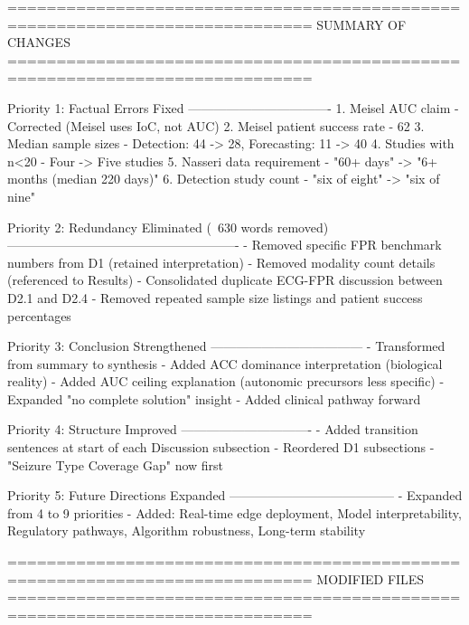 
=============================================================================
SUMMARY OF CHANGES
=============================================================================

Priority 1: Factual Errors Fixed
----------------------------------
1. Meisel AUC claim - Corrected (Meisel uses IoC, not AUC)
2. Meisel patient success rate - 62%
3. Median sample sizes - Detection: 44 -> 28, Forecasting: 11 -> 40
4. Studies with n<20 - Four -> Five studies
5. Nasseri data requirement - "60+ days" -> "6+ months (median 220 days)"
6. Detection study count - "six of eight" -> "six of nine"

Priority 2: Redundancy Eliminated (~630 words removed)
-------------------------------------------------------
- Removed specific FPR benchmark numbers from D1 (retained interpretation)
- Removed modality count details (referenced to Results)
- Consolidated duplicate ECG-FPR discussion between D2.1 and D2.4
- Removed repeated sample size listings and patient success percentages

Priority 3: Conclusion Strengthened
------------------------------------
- Transformed from summary to synthesis
- Added ACC dominance interpretation (biological reality)
- Added AUC ceiling explanation (autonomic precursors less specific)
- Expanded "no complete solution" insight
- Added clinical pathway forward

Priority 4: Structure Improved
-------------------------------
- Added transition sentences at start of each Discussion subsection
- Reordered D1 subsections - "Seizure Type Coverage Gap" now first

Priority 5: Future Directions Expanded
---------------------------------------
- Expanded from 4 to 9 priorities
- Added: Real-time edge deployment, Model interpretability,
  Regulatory pathways, Algorithm robustness, Long-term stability

=============================================================================
MODIFIED FILES
=============================================================================

